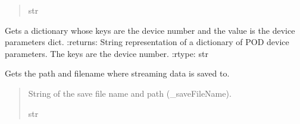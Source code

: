 \documentclass[letterpaper,10pt,english]{sphinxmanual}
\begin{document}
\begin{fulllineitems}
\begin{fulllineitems}
\begin{quote}
\begin{description}
\sphinxAtStartPar
str

\end{description}\end{quote}

\end{fulllineitems}


\begin{fulllineitems}
\label{\detokenize{Setup.SetupOneDevice:Setup.SetupOneDevice.Setup_PodInterface.SetupInterface.GetPODparametersInit}}
\pysigstartsignatures
{}
\pysigstopsignatures
\sphinxAtStartPar
Gets a dictionary whose keys are the device number and the value is the device parameters dict.
:returns: String representation of a dictionary of POD device parameters. The keys are the device number.
:rtype: str

\end{fulllineitems}


\begin{fulllineitems}
\label{\detokenize{Setup.SetupOneDevice:Setup.SetupOneDevice.Setup_PodInterface.SetupInterface.GetSaveFileName}}
\pysigstartsignatures
{}
\pysigstopsignatures
\sphinxAtStartPar
Gets the path and filename where streaming data is saved to.
\begin{quote}\begin{description}
\sphinxAtStartPar
String of the save file name and path (\_saveFileName).

\sphinxAtStartPar
str

\end{description}\end{quote}

\end{fulllineitems}



\end{fulllineitems}
\end{document}
